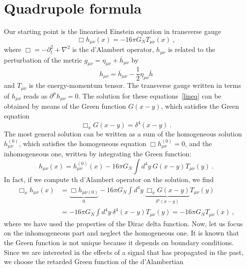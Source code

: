 \documentclass[a4paper]{article}
\begin{document}
\section{Quadrupole formula}

    Our starting point is the linearised Einstein equation in transverse gauge
    \begin{equation}\label{lineq}
        \Box h_{\mu\nu}  (x) = - 16 \pi G_N T_{\mu\nu} (x) ~,
    \end{equation}
    where $\Box = - \partial_t^2 + \nabla^2$ is the d'Alambert operator, $h_{\mu\nu}$ is related to the perturbation of the metric $g_{\mu\nu} = \eta_{\mu\nu} + \overline h_{\mu\nu}$ by 
    \begin{equation*}
        h_{\mu\nu} = \overline h_{\mu\nu} - \frac{1}{2} \eta_{\mu\nu} \overline h
    \end{equation*}
    and $T_{\mu\nu}$ is the energy-momentum tensor. The transverse gauge written in terms of $h_{\mu\nu}$ reads as $\partial^\mu h_{\mu\nu} = 0$. The solution for these equations~\eqref{lineq} can be obtained by means of the Green function $G (x - y)$, which satisfies the Green equation 
    \begin{equation*}
        \Box_x G (x - y) = \delta^4 (x - y) ~.
    \end{equation*}
    The most general solution can be written as a sum of the homogeneous solution $h^{(0)}_{\mu\nu} $, which satisfies the homogeneous equation $\Box h_{\mu\nu}^{(0)}  = 0$, and the inhomogeneous one, written by integrating the Green function:
    \begin{equation*}
        h_{\mu\nu} (x)  = h^{(0)}_{\mu\nu} (x)  - 16 \pi G_N \int d^4 y ~ G (x - y) T_{\mu \nu} (y) ~.
    \end{equation*}
    In fact, if we compute th d'Alambert operator on the solution, we find
    \begin{equation*}
    \begin{aligned}
        \Box_x h_{\mu\nu}  (x) & = \underbrace{\Box h_{\mu\nu (0)} }_0 - 16 \pi G_N \int d^4 y ~ \underbrace{\Box_x G (x - y)}_{\delta^4 (x - y)} T_{\mu \nu} (y) \\ & = - 16 \pi G_N \int d^4 y ~ \delta^4 (x - y) T_{\mu \nu} (y) = - 16 \pi G_N T_{\mu\nu} (x) ~,
    \end{aligned}
    \end{equation*}
    where we have used the properties of the Dirac delta function. Now, let us focus on the inhomogeneous part and neglect the homogeneous one. It is known that the Green function is not unique because it depends on boundary conditions. Since we are interested in the effects of a signal that has propagated in the past, we choose the retarded Green function of the d'Alambertian~\cite{barone}
\end{document}
